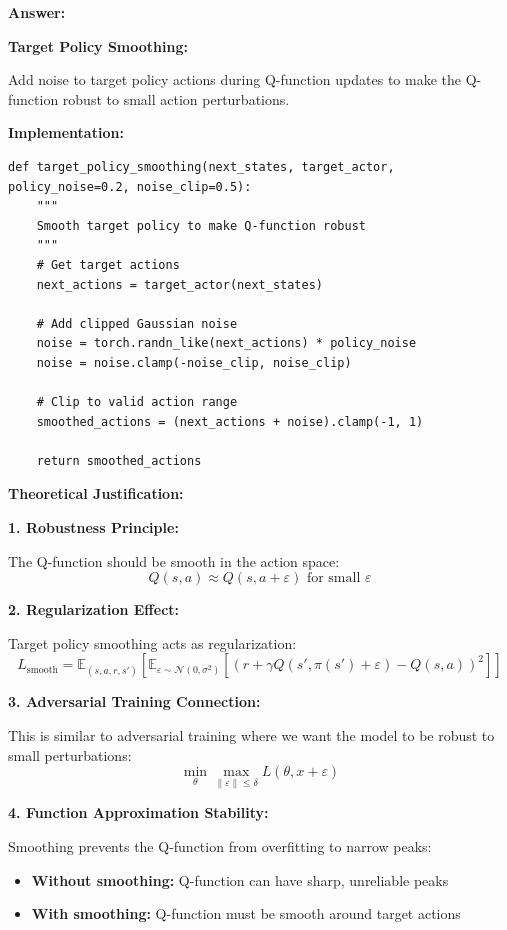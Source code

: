 \documentclass[12pt]{article}
\begin{document}
{{\textbf{Answer:}

\textbf{Target Policy Smoothing:}

Add noise to target policy actions during Q-function updates to make the Q-function robust to small action perturbations.

\textbf{Implementation:}

\begin{verbatim}
def target_policy_smoothing(next_states, target_actor, policy_noise=0.2, noise_clip=0.5):
    """
    Smooth target policy to make Q-function robust
    """
    # Get target actions
    next_actions = target_actor(next_states)
    
    # Add clipped Gaussian noise
    noise = torch.randn_like(next_actions) * policy_noise
    noise = noise.clamp(-noise_clip, noise_clip)
    
    # Clip to valid action range
    smoothed_actions = (next_actions + noise).clamp(-1, 1)
    
    return smoothed_actions
\end{verbatim}

\textbf{Theoretical Justification:}

\textbf{1. Robustness Principle:}

The Q-function should be smooth in the action space:
\begin{equation}
Q(s, a) \approx Q(s, a + \varepsilon) \text{ for small } \varepsilon
\end{equation}

\textbf{2. Regularization Effect:}

Target policy smoothing acts as regularization:
\begin{equation}
L_{\text{smooth}} = \mathbb{E}_{(s,a,r,s')} \left[ \mathbb{E}_{\varepsilon \sim \mathcal{N}(0, \sigma^2)} \left[ (r + \gamma Q(s', \pi(s') + \varepsilon) - Q(s,a))^2 \right] \right]
\end{equation}

\textbf{3. Adversarial Training Connection:}

This is similar to adversarial training where we want the model to be robust to small perturbations:
\begin{equation}
\min_\theta \max_{\|\varepsilon\| \leq \delta} L(\theta, x + \varepsilon)
\end{equation}

\textbf{4. Function Approximation Stability:}

Smoothing prevents the Q-function from overfitting to narrow peaks:
\begin{itemize}
\item \textbf{Without smoothing:} Q-function can have sharp, unreliable peaks
\item \textbf{With smoothing:} Q-function must be smooth around target actions
\end{itemize}

}}
\end{document}
